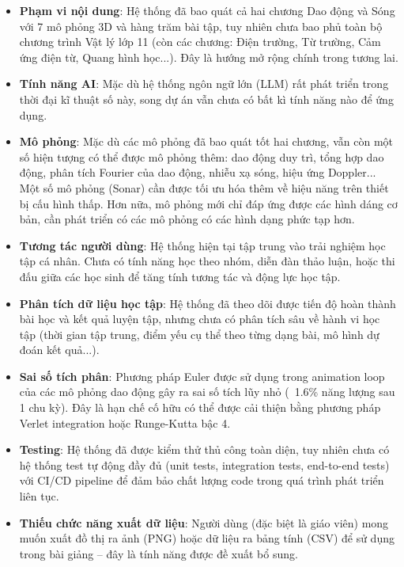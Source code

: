 \begin{itemize}
    \item \textbf{Phạm vi nội dung}: Hệ thống đã bao quát cả hai chương Dao động và Sóng với 7 mô phỏng 3D và hàng trăm bài tập, tuy nhiên chưa bao phủ toàn bộ chương trình Vật lý lớp 11 (còn các chương: Điện trường, Từ trường, Cảm ứng điện từ, Quang hình học...). Đây là hướng mở rộng chính trong tương lai.
    
    \item \textbf{Tính năng AI}: Mặc dù hệ thống ngôn ngữ lớn (LLM) rất phát triển trong thời đại kĩ thuật số này, song dự án vẫn chưa có bất kì tính năng nào để ứng dụng.
    
    \item \textbf{Mô phỏng}: Mặc dù các mô phỏng đã bao quát tốt hai chương, vẫn còn một số hiện tượng có thể được mô phỏng thêm: dao động duy trì, tổng hợp dao động, phân tích Fourier của dao động, nhiễu xạ sóng, hiệu ứng Doppler... Một số mô phỏng (Sonar) cần được tối ưu hóa thêm về hiệu năng trên thiết bị cấu hình thấp. Hơn nữa, mô phỏng mới chỉ đáp ứng được các hình dáng cơ bản, cần phát triển có các mô phỏng có các hình dạng phức tạp hơn.
    
    \item \textbf{Tương tác người dùng}: Hệ thống hiện tại tập trung vào trải nghiệm học tập cá nhân. Chưa có tính năng học theo nhóm, diễn đàn thảo luận, hoặc thi đấu giữa các học sinh để tăng tính tương tác và động lực học tập.
    
    \item \textbf{Phân tích dữ liệu học tập}: Hệ thống đã theo dõi được tiến độ hoàn thành bài học và kết quả luyện tập, nhưng chưa có phân tích sâu về hành vi học tập (thời gian tập trung, điểm yếu cụ thể theo từng dạng bài, mô hình dự đoán kết quả...).
    
    \item \textbf{Sai số tích phân}: Phương pháp Euler được sử dụng trong animation loop của các mô phỏng dao động gây ra sai số tích lũy nhỏ (~1.6\% năng lượng sau 1 chu kỳ). Đây là hạn chế cố hữu có thể được cải thiện bằng phương pháp Verlet integration hoặc Runge-Kutta bậc 4.
    
    \item \textbf{Testing}: Hệ thống đã được kiểm thử thủ công toàn diện, tuy nhiên chưa có hệ thống test tự động đầy đủ (unit tests, integration tests, end-to-end tests) với CI/CD pipeline để đảm bảo chất lượng code trong quá trình phát triển liên tục.
    
    \item \textbf{Thiếu chức năng xuất dữ liệu}: Người dùng (đặc biệt là giáo viên) mong muốn xuất đồ thị ra ảnh (PNG) hoặc dữ liệu ra bảng tính (CSV) để sử dụng trong bài giảng – đây là tính năng được đề xuất bổ sung.
\end{itemize}

